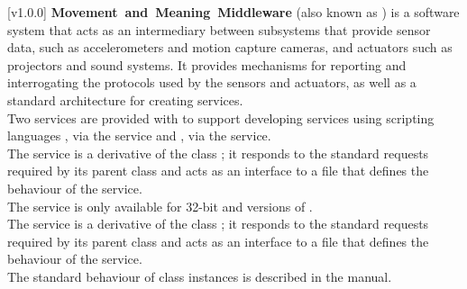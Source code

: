 [v1.0.0]
\textbf{Movement~and~Meaning~Middleware} (also known as \mplusm{}) is a software system
that acts as an intermediary between subsystems that provide sensor data, such as
accelerometers and motion capture cameras, and actuators such as projectors and sound
systems.
It provides mechanisms for reporting and interrogating the protocols used by the sensors
and actuators, as well as a standard architecture for creating services.\\

Two services are provided with \mplusm{} to support developing services using scripting
languages \longDash{} \CL, via the \CLF{} service and \JS, via the \JSF{} service.\\

The \CLF{} service is a derivative of the \mplusm{} class ;
it responds to the standard requests required by its parent class and acts as an interface
to a \CL{} file that defines the behaviour of the service.\\

The \CLF{} service is only available for \win{} 32-bit and \osx{} versions of \mplusm.\\

The \JSF{} service is a derivative of the \mplusm{} class ;
it responds to the standard requests required by its parent class and acts as an interface
to a \JS{} file that defines the behaviour of the service.\\

The standard behaviour of  class instances is described in
the \emph{\MMM} manual.
\primaryEnd{}
